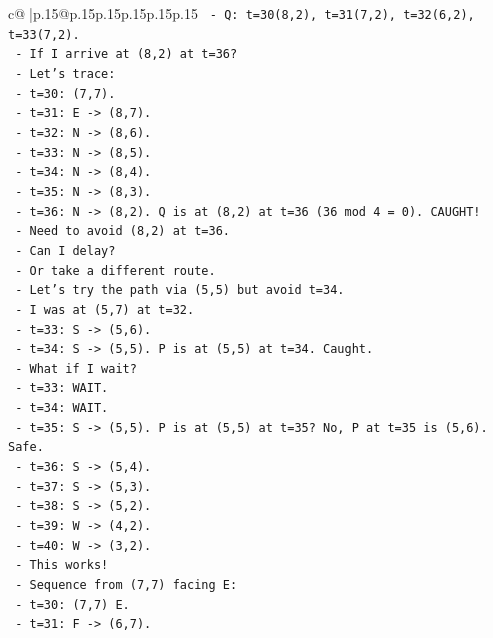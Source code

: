 \documentclass{article}
\begin{document}
{\begin{supertabular}{c@{$\;$}|p{.15\linewidth}@{}p{.15\linewidth}p{.15\linewidth}p{.15\linewidth}p{.15\linewidth}p{.15\linewidth}}
{{{\texttt{        {-} Q: t=30(8,2), t=31(7,2), t=32(6,2), t=33(7,2).} \\
\texttt{        {-} If I arrive at (8,2) at t=36?} \\
\texttt{        {-} Let's trace:} \\
\texttt{          {-} t=30: (7,7).} \\
\texttt{          {-} t=31: E {-}> (8,7).} \\
\texttt{          {-} t=32: N {-}> (8,6).} \\
\texttt{          {-} t=33: N {-}> (8,5).} \\
\texttt{          {-} t=34: N {-}> (8,4).} \\
\texttt{          {-} t=35: N {-}> (8,3).} \\
\texttt{          {-} t=36: N {-}> (8,2). Q is at (8,2) at t=36 (36 mod 4 = 0). CAUGHT!} \\
\texttt{        {-} Need to avoid (8,2) at t=36.} \\
\texttt{        {-} Can I delay?} \\
\texttt{        {-} Or take a different route.} \\
\texttt{    {-} Let's try the path via (5,5) but avoid t=34.} \\
\texttt{      {-} I was at (5,7) at t=32.} \\
\texttt{      {-} t=33: S {-}> (5,6).} \\
\texttt{      {-} t=34: S {-}> (5,5). P is at (5,5) at t=34. Caught.} \\
\texttt{      {-} What if I wait?} \\
\texttt{      {-} t=33: WAIT.} \\
\texttt{      {-} t=34: WAIT.} \\
\texttt{      {-} t=35: S {-}> (5,5). P is at (5,5) at t=35? No, P at t=35 is (5,6). Safe.} \\
\texttt{      {-} t=36: S {-}> (5,4).} \\
\texttt{      {-} t=37: S {-}> (5,3).} \\
\texttt{      {-} t=38: S {-}> (5,2).} \\
\texttt{      {-} t=39: W {-}> (4,2).} \\
\texttt{      {-} t=40: W {-}> (3,2).} \\
\texttt{      {-} This works!} \\
\texttt{      {-} Sequence from (7,7) facing E:} \\
\texttt{        {-} t=30: (7,7) E.} \\
\texttt{        {-} t=31: F {-}> (6,7).} \\
}}}
\end{supertabular}}
\end{document}
